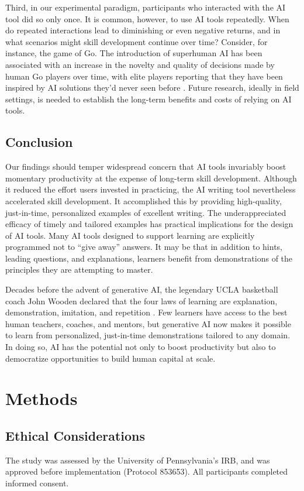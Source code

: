 \documentclass[11pt]{report}
\begin{document}
\begin{mainf}
Third, in our experimental paradigm, participants who interacted with the AI tool did so only once. 
  It is common, however, to use AI tools repeatedly. 
  When do repeated interactions lead to diminishing or even negative returns, and in what scenarios might skill development continue over time?  Consider, for instance, the game of Go. The introduction of superhuman AI has been associated with an increase in the novelty and quality of decisions made by human Go players over time, with elite players reporting that they have been inspired by AI solutions they'd never seen before \cite{shin2023}.     
  Future research, ideally in field settings, is needed to establish the long-term benefits and costs of relying on AI tools.


\subsection*{Conclusion}
Our findings should temper widespread concern that AI tools invariably boost momentary productivity at the expense of long-term skill development.  
  Although it reduced the effort users invested in practicing, the AI writing tool nevertheless accelerated skill development.
  It accomplished this by providing high-quality, just-in-time, personalized examples of excellent writing.
  The underappreciated efficacy of timely and tailored examples has practical implications for the design of AI tools. 
  Many AI tools designed to support learning are explicitly programmed not to ``give away'' answers. 
  It may be that in addition to hints, leading questions, and explanations, learners benefit from demonstrations of the principles they are attempting to master.
  
  Decades before the advent of generative AI, the legendary UCLA basketball coach John Wooden declared that the four laws of learning are explanation, demonstration, imitation, and repetition \cite{whut2010}. 
  Few learners have access to the best human teachers, coaches, and mentors, but generative AI now makes it possible to learn from personalized, just-in-time demonstrations tailored to any domain. 
  In doing so, AI has the potential not only to boost productivity but also to democratize opportunities to build human capital at scale.

\section*{Methods}
\subsection*{Ethical Considerations}
The study was assessed by the University of Pennsylvania's IRB, and was approved before implementation (Protocol 853653). All participants completed informed consent.


\end{mainf}
\end{document}
